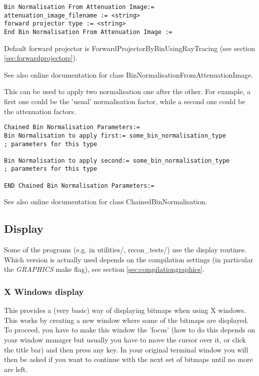 \documentclass{article}
\begin{document}
{ 
}
\begin{verbatim}
Bin Normalisation From Attenuation Image:=
attenuation_image_filename := <string>
forward projector type := <string>
End Bin Normalisation From Attenuation Image :=
\end{verbatim}


Default forward projector is ForwardProjectorByBinUsingRayTracing 
(see section \ref{sec:forwardprojectors}).


See also online documentation for class BinNormalisationFromAttenuationImage.

{ 
}
\label{sec:chainedbinnormalisation}
This can be used to apply two normalisation one after the other. 
For example, a first one could be the 'usual' normalisation factor, 
while a second one could be the attenuation factors.

{ 
}
\begin{verbatim}
Chained Bin Normalisation Parameters:=
Bin Normalisation to apply first:= some_bin_normalisation_type
; parameters for this type

Bin Normalisation to apply second:= some_bin_normalisation_type
; parameters for this type

END Chained Bin Normalisation Parameters:=
\end{verbatim}

See also online documentation for class ChainedBinNormalisation.



\subsection{
Display}

Some of the programs (e.g. in utilities/, recon\_tests/) use 
the display routines. Which version is actually used depends 
on the compilation settings (in particular the \textit{GRAPHICS} make 
flag), see section \ref{sec:compilationgraphics}. 


\subsubsection{
X Windows display}
\label{sec:display}
This provides a (very basic) way of displaying bitmaps when using 
X windows. This works by creating a new window where some of 
the bitmaps are displayed. To proceed, you have to make this 
window the 'focus' (how to do this depends on your window manager 
but usually you have to move the cursor over it, or click the 
title bar) and then press any key. In your original terminal 
window you will then be asked if you want to continue with the 
next set of bitmaps until no more are left.
\end{document}
